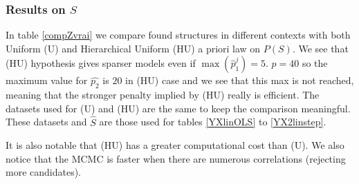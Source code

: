 \documentclass[11pt,a4paper]{article}
\begin{document}
		\subsubsection{Results on $S$}	\label{compZ}
In table \ref{compZvrai} we compare found structures in different contexts with both Uniform (U) and Hierarchical Uniform (HU) a priori law on $P(S)$. 
We see that (HU) hypothesis gives sparser models even if $\max (\hat{p}_1^j)=5$. $p=40$ so the maximum value for $\hat{p_2}$ is $20$ in (HU) case and we see that this max is not reached, meaning that the stronger penalty implied by (HU) really is efficient. The datasets used for (U) and (HU) are the same to keep the comparison  meaningful. These datasets and $\hat{S}$ are those used for tables 
 \ref{YXlinOLS} to \ref{YX2linstep}.
 
 It is also notable that (HU) has a greater computational cost than (U). 
	We also notice that the MCMC is faster when there are numerous correlations (rejecting more candidates). 
\end{document}

